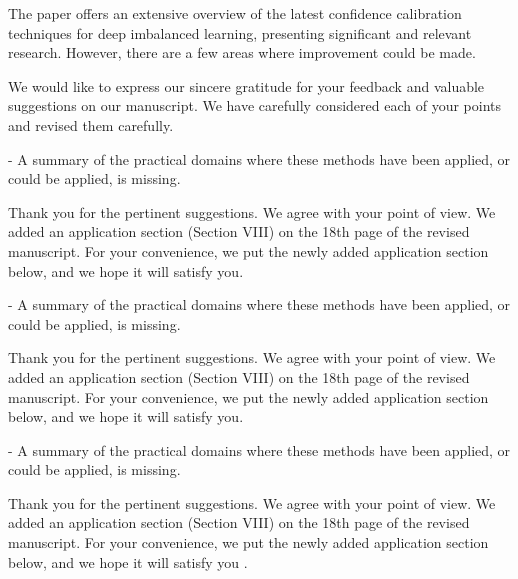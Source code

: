 
\reviewer

\begin{generalcomment}
The paper offers an extensive overview of the latest confidence calibration techniques for deep imbalanced learning, presenting significant and relevant research. However, there are a few areas where improvement could be made.
\end{generalcomment}
\begin{revmeta}[]
We would like to express our sincere gratitude for your feedback and valuable suggestions on our manuscript. We have carefully considered each of your points and revised them carefully.
\end{revmeta}

\begin{revcomment}
- A summary of the practical domains where these methods have been applied, or could be applied, is missing.
\end{revcomment}
\begin{revresponse}[]
Thank you for the pertinent suggestions. We agree with your point of view. We added an application section (Section VIII) on the 18th page of the revised manuscript. For your convenience, we put the newly added application section below, and we hope it will satisfy you.
	

	
\end{revresponse}



\begin{revcomment}
- A summary of the practical domains where these methods have been applied, or could be applied, is missing.
\end{revcomment}
\begin{revresponse}[]
Thank you for the pertinent suggestions. We agree with your point of view. We added an application section (Section VIII) on the 18th page of the revised manuscript. For your convenience, we put the newly added application section below, and we hope it will satisfy you.
	

	
\end{revresponse}



\begin{revcomment}
- A summary of the practical domains where these methods have been applied, or could be applied, is missing.
\end{revcomment}
\begin{revresponse}[]
Thank you for the pertinent suggestions. We agree with your point of view. We added an application section (Section VIII) on the 18th page of the revised manuscript. For your convenience, we put the newly added application section below, and we hope it will satisfy you \cite{wu2020comprehensive,ji2021survey,li2021survey,zhang2023survey,li2021low}.
	

	
\end{revresponse}




